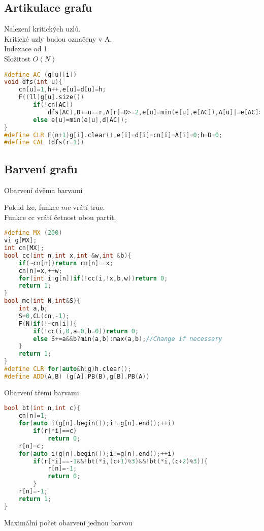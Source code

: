 \documentclass[11pt]{article}
\begin{document}
\subsection{Artikulace grafu}
Nalezení kritických uzlů.
\\Kritické uzly budou označeny v \textsf{A}.
\\Indexace od 1
\\Složitost $O(N)$
\begin{lstlisting}[language=C++]
#define AC (g[u][i])
void dfs(int u){
    cn[u]=1,h++,e[u]=d[u]=h;
    F((ll)g[u].size())
        if(!cn[AC])
        	dfs(AC),D+=u==r,A[r]=D>=2,e[u]=min(e[u],e[AC]),A[u]|=e[AC]>=d[u]&&u!=r;
        else e[u]=min(e[u],d[AC]);
}
#define CLR F(n+1)g[i].clear(),e[i]=d[i]=cn[i]=A[i]=0;h=D=0;
#define CAL (dfs(r=1))
\end{lstlisting}
\subsection{Barvení grafu}
\begin{center}
Obarvení dvěma barvami
\end{center}
Pokud lze, funkce $mc$ vrátí true.
\\Funkce cc vrátí četnost obou partit.
\begin{lstlisting}[language=C++]
#define MX (200)
vi g[MX];
int cn[MX];
bool cc(int n,int x,int &w,int &b){
    if(~cn[n])return cn[n]==x;
    cn[n]=x,++w;
    for(int i:g[n])if(!cc(i,!x,b,w))return 0;
    return 1;
}
bool mc(int N,int&S){
    int a,b;
    S=0,CL(cn,-1);
    F(N)if(!~cn[i]){
        if(!cc(i,0,a=0,b=0))return 0;
        else S+=a&&b?min(a,b):max(a,b);//Change if necessary
    }
    return 1;
}
#define CLR for(auto&h:g)h.clear();
#define ADD(A,B) (g[A].PB(B),g[B].PB(A))
\end{lstlisting}
\begin{center}
Obarvení třemi barvami
\end{center}
\begin{lstlisting}[language=C++]
bool bt(int n,int c){
    cn[n]=1;
    for(auto i(g[n].begin());i!=g[n].end();++i)
        if(r[*i]==c)
            return 0;
    r[n]=c;
    for(auto i(g[n].begin());i!=g[n].end();++i)
        if(r[*i]==-1&&!bt(*i,(c+1)%3)&&!bt(*i,(c+2)%3)){
            r[n]=-1;
            return 0;
        }
    r[n]=-1;
    return 1;
}
\end{lstlisting}
\begin{center}
Maximální počet obarvení jednou barvou
\end{center}
\end{document}
